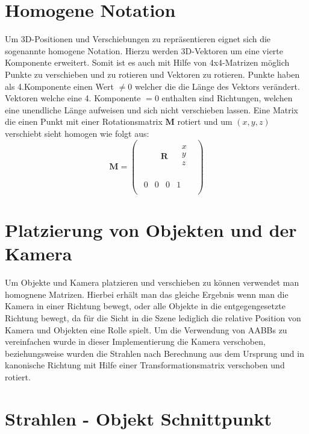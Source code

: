 \documentclass[a4paper]{article}
\begin{document}
\section*{Homogene Notation}
Um 3D-Positionen und Verschiebungen zu repräsentieren eignet sich die sogenannte homogene Notation. Hierzu werden 3D-Vektoren um eine vierte Komponente erweitert. Somit ist es auch mit Hilfe von 4x4-Matrizen möglich Punkte zu verschieben und zu rotieren und Vektoren zu rotieren. Punkte haben als 4.Komponente einen Wert $\neq 0$ welcher die die Länge des Vektors verändert. Vektoren welche eine 4. Komponente $= 0$ enthalten sind Richtungen, welchen eine unendliche Länge aufweisen und sich nicht verschieben lassen. Eine Matrix die einen Punkt mit einer Rotationsmatrix $\mathbf{M}$ rotiert und um $(x,y,z)$ verschiebt sieht homogen wie folgt aus:\\
\[\mathbf{M} = \left(\begin{array}{c}
\begin{array}{cr}
   \qquad \mathbf{R} ~~ & \begin{array}{c}
				x\\
				y\\
				z\\
			\end{array}\\
	\end{array}\\
	\begin{array}{cccc}
		0 & 0 & 0	& 1 \\
	\end{array}
	\end{array}
	\right)\]	 

\section*{Platzierung von Objekten und der Kamera}
Um Objekte und Kamera platzieren und verschieben zu können verwendet man homognene Matrizen. Hierbei erhält man das gleiche Ergebnis wenn man die Kamera in einer Richtung bewegt, oder alle Objekte in die entgegengesetzte Richtung bewegt, da für die Sicht in die Szene lediglich die relative Position von Kamera und Objekten eine Rolle spielt.
Um die Verwendung von AABBs zu vereinfachen wurde in dieser Implementierung die Kamera verschoben, beziehungsweise wurden die Strahlen nach Berechnung aus dem Ursprung und in kanonische Richtung mit Hilfe einer Transformationsmatrix verschoben und rotiert.

\section*{Strahlen - Objekt Schnittpunkt}
\end{document}

